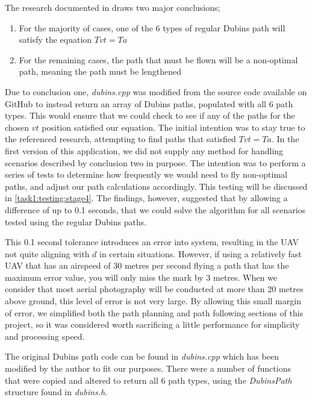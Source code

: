The research documented in \cite{mcgee2005optimal} draws two major conclusions;

\begin{enumerate}
	\item For the majority of cases, one of the 6 types of regular Dubins path will satisfy the equation $Tvt = Ta$
	\item For the remaining cases, the path that must be flown will be a non-optimal path, meaning the path must be lengthened 
\end{enumerate}

Due to conclusion one, \textit{dubins.cpp} was modified from the source code available on GitHub to instead return an array of Dubins paths, populated with all 6 path types. This would ensure that we could check to see if any of the paths for the chosen $vt$ position satisfied our equation. The initial intention was to stay true to the referenced research, attempting to find paths that satisfied $Tvt = Ta$. In the first version of this application, we did not supply any method for handling scenarios described by conclusion two in purpose. The intention was to perform a series of tests to determine how frequently we would need to fly non-optimal paths, and adjust our path calculations accordingly. This testing will be discussed in \ref{task1:testing:stage4}. The findings, however, suggested that by allowing a difference of up to 0.1 seconds, that we could solve the algorithm for all scenarios tested using the regular Dubins paths. 

This 0.1 second tolerance introduces an error into system, resulting in the UAV not quite aligning with $d$ in certain situations. However, if using a relatively fast UAV that has an airspeed of 30 metres per second flying a path that has the maximum error value, you will only miss the mark by 3 metres. When we consider that most aerial photography will be conducted at more than 20 metres above ground, this level of error is not very large. By allowing this small margin of error, we simplified both the path planning and path following sections of this project, so it was considered worth sacrificing a little performance for simplicity and processing speed.


The original Dubins path code can be found in \textit{dubins.cpp} which has been modified by the author to fit our purposes. There were a number of functions that were copied and altered to return all 6 path types, using the \textit{DubinsPath} structure found in \textit{dubins.h}. 

